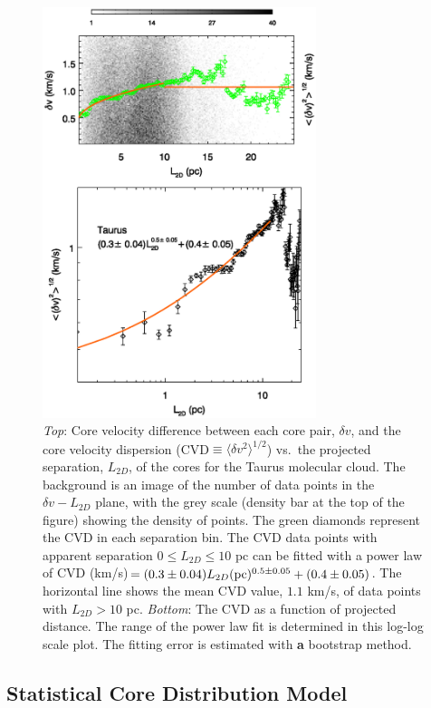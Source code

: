 \documentclass[iop,revtex4]{emulateapj}
\begin{document}
\begin{figure}[htbp]
\begin{minipage}[b]{0.45\textwidth}
\includegraphics[width=8cm]{vdis_all_all.eps}
\end{minipage}
\caption{{\it Top}: Core velocity difference between each core pair, $\delta v$, and the core velocity dispersion
(CVD$\equiv \langle\delta v^2\rangle^{1/2}$) vs.\ the
projected separation, $L_{2D}$, of the cores for the Taurus molecular cloud. The background is an
image of the number of data points in the $\delta v - L_{2D}$ plane, with the
grey scale (density bar at the top of the figure) showing the
density of points. The green diamonds represent the CVD in each
separation bin. The CVD data points with apparent separation $ 0
\leq L_{2D} \leq 10$  pc can be fitted with a power law of CVD
(km/s)$=(0.3\pm 0.04)L_{2D} ({\rm pc})^{0.5\pm 0.05}+(0.4\pm 0.05)$. The horizontal line shows the
mean CVD value, $1.1$ km/s, of data points with $L_{2D}> 10$ pc. {\it Bottom}: The CVD as a function of projected distance. The range of the power law fit is determined in this log-log scale plot. The fitting error is estimated with {\bf a} bootstrap method.}
\label{fig:vdis_all}
\end{figure}



\subsection{Statistical Core Distribution Model}
\label{subsec:random_cores}
\end{document}
